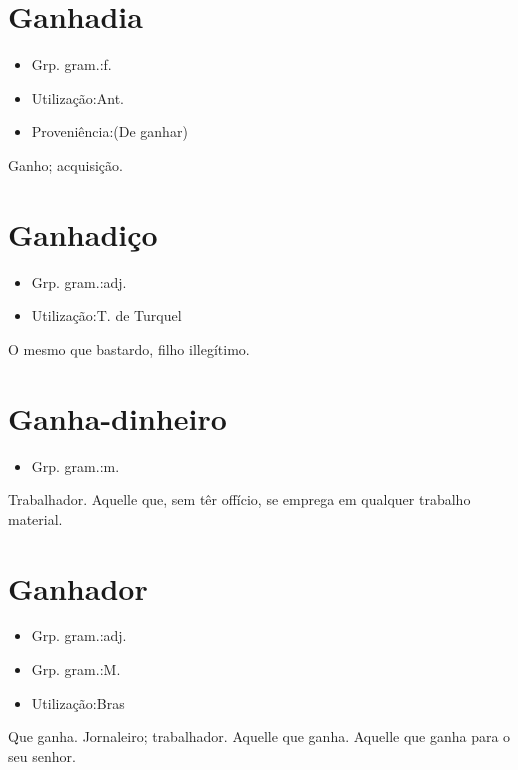 \section{Ganhadia}
\begin{itemize}
\item {Grp. gram.:f.}
\end{itemize}
\begin{itemize}
\item {Utilização:Ant.}
\end{itemize}
\begin{itemize}
\item {Proveniência:(De \textunderscore ganhar\textunderscore )}
\end{itemize}
Ganho; acquisição.
\section{Ganhadiço}
\begin{itemize}
\item {Grp. gram.:adj.}
\end{itemize}
\begin{itemize}
\item {Utilização:T. de Turquel}
\end{itemize}
O mesmo que \textunderscore bastardo\textunderscore , filho illegítimo.
\section{Ganha-dinheiro}
\begin{itemize}
\item {Grp. gram.:m.}
\end{itemize}
Trabalhador.
Aquelle que, sem têr offício, se emprega em qualquer trabalho material.
\section{Ganhador}
\begin{itemize}
\item {Grp. gram.:adj.}
\end{itemize}
\begin{itemize}
\item {Grp. gram.:M.}
\end{itemize}
\begin{itemize}
\item {Utilização:Bras}
\end{itemize}
Que ganha.
Jornaleiro; trabalhador.
Aquelle que ganha.
Aquelle que ganha para o seu senhor.
